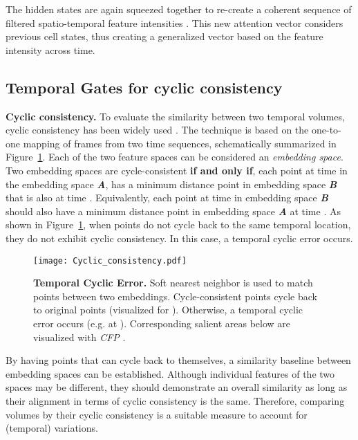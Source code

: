 \documentclass[final,5p,times,twocolumn]{elsarticle}
\begin{document}
The hidden states are again squeezed together to re-create a coherent sequence of filtered spatio-temporal feature intensities . This new attention vector considers previous cell states, thus creating a generalized vector based on the feature intensity across time.

\subsection{Temporal Gates for cyclic consistency}
\label{sec:TG}

\textbf{Cyclic consistency.} To evaluate the similarity between two temporal volumes, cyclic consistency has been widely used \citep{dwibedi2019temporal,wang2019learning}. The technique is based on the one-to-one mapping of frames from two time sequences, schematically summarized in Figure~\ref{fig:Cyclic_consistency}. Each of the two feature spaces can be considered an \textit{embedding space}. Two embedding spaces are cycle-consistent \textbf{if and only if}, each point at time   in the embedding space \textbf{\textit{A}}, has a minimum distance point in embedding space \textbf{\textit{B}} that is also at time . Equivalently, each point at time  in embedding space \textbf{\textit{B}} should also have a minimum distance point in embedding space \textbf{\textit{A}} at time . As shown in Figure~\ref{fig:Cyclic_consistency}, when points do not cycle back to the same temporal location, they do not exhibit cyclic consistency. In this case, a temporal cyclic error occurs.

\begin{figure}[!htb]
\centering
\texttt{[image: Cyclic\_consistency.pdf]}
\caption{\textbf{Temporal Cyclic Error.} Soft nearest neighbor is used to match points between two embeddings. Cycle-consistent points cycle back to original points (visualized for ). Otherwise, a temporal cyclic error occurs (e.g. at ). Corresponding salient areas below are visualized with \textit{CFP} \citep{stergiou2019class}.}
\label{fig:Cyclic_consistency}
\end{figure}

By having points that can cycle back to themselves, a similarity baseline between embedding spaces can be established. Although individual features of the two spaces may be different, they should demonstrate an overall similarity as long as their alignment in terms of cyclic consistency is the same. Therefore, comparing volumes by their cyclic consistency is a suitable measure to account for (temporal) variations.
\end{document}
